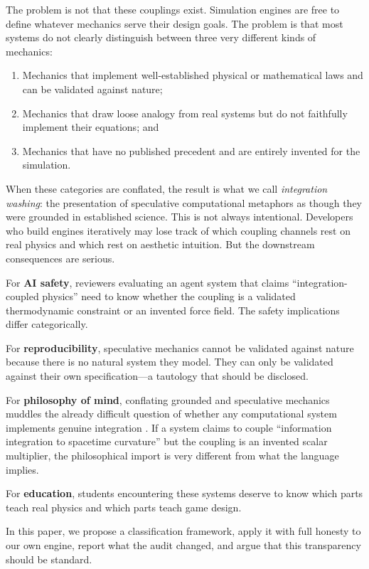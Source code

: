 \documentclass[12pt,a4paper]{article}
\begin{document}
The problem is not that these couplings exist.  Simulation
engines are free to define whatever mechanics serve their design
goals.  The problem is that most systems do not clearly
distinguish between three very different kinds of mechanics:

\begin{enumerate}
  \item[(i)] Mechanics that implement well-established physical or
    mathematical laws and can be validated against nature;
  \item[(ii)] Mechanics that draw loose analogy from real systems but
    do not faithfully implement their equations; and
  \item[(iii)] Mechanics that have no published precedent and are
    entirely invented for the simulation.
\end{enumerate}

When these categories are conflated, the result is what we call
\emph{integration washing}: the presentation of speculative
computational metaphors as though they were grounded in
established science.  This is not always intentional.
Developers who build engines iteratively may lose track of which
coupling channels rest on real physics and which rest on
aesthetic intuition.  But the downstream consequences are
serious.

For \textbf{AI safety}, reviewers evaluating an agent system
that claims ``integration-coupled physics'' need to know whether
the coupling is a validated thermodynamic constraint or an
invented force field.  The safety implications differ
categorically.

For \textbf{reproducibility}, speculative mechanics cannot be
validated against nature because there is no natural system they
model.  They can only be validated against their own
specification---a tautology that should be disclosed.

For \textbf{philosophy of mind}, conflating grounded and
speculative mechanics muddles the already difficult question of
whether any computational system implements genuine integration
\citep{chalmers1995}.  If a system claims to couple
``information integration to spacetime curvature'' but the
coupling is an invented scalar multiplier, the philosophical
import is very different from what the language implies.

For \textbf{education}, students encountering these systems
deserve to know which parts teach real physics and which parts
teach game design.

In this paper, we propose a classification framework, apply it
with full honesty to our own engine, report what the audit
changed, and argue that this transparency should be standard.
\end{document}
